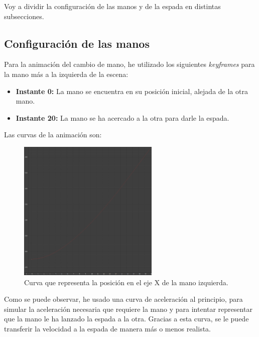 Voy a dividir la configuración de las manos y de la espada en distintas subsecciones.

\subsection{Configuración de las manos}

Para la animación del cambio de mano, he utilizado los siguientes \textit{keyframes} para la mano más a la izquierda de la escena:

\begin{itemize}
    \item \textbf{Instante 0: }La mano se encuentra en su posición inicial, alejada de la otra mano.
    \item \textbf{Instante 20: }La mano se ha acercado a la otra para darle la espada.
\end{itemize}

Las curvas de la animación son:

\begin{figure}[H]
   \centering
   \includegraphics[width=0.6\textwidth]{imagenes/manos/izquierda/posX.png}
   \caption{Curva que representa la posición en el eje X de la mano izquierda.}
\end{figure}



Como se puede observar, he usado una curva de aceleración al principio, para simular la aceleración necesaria que requiere la mano y para intentar representar que la mano le ha lanzado la espada a la otra. Gracias a esta curva, se le puede transferir la velocidad a la espada de manera más o menos realista.

